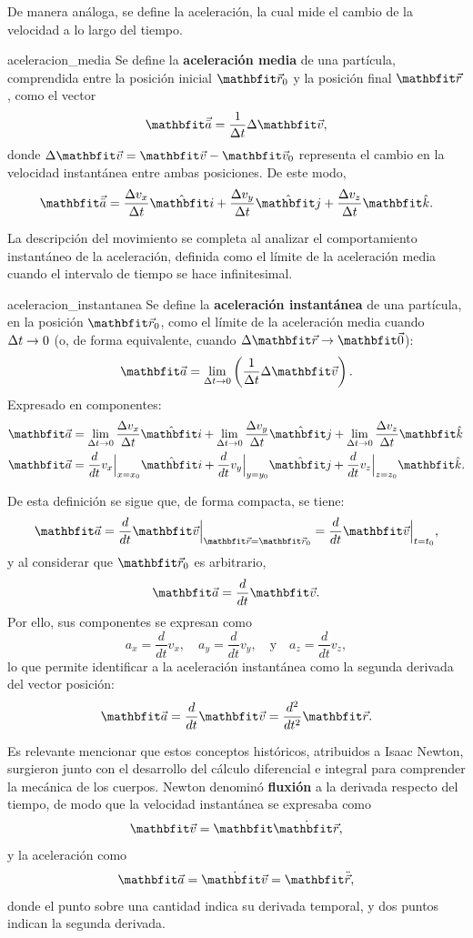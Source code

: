 De manera análoga, se define la aceleración, la cual mide el cambio de la velocidad a lo largo del tiempo.

\begin{definition}{}{aceleracion_media}
    Se define la \textbf{aceleración media} de una partícula, comprendida entre la posición inicial $\vecr_0$ y la posición final $\vecr$, como el vector
    $$\acem = \frac{1}{\Deltat}\Deltav,$$
    donde $\Deltav = \veloi - \veloi_0$ representa el cambio en la velocidad instantánea entre ambas posiciones. De este modo,
    $$\acem = \frac{\Deltavx}{\Deltat}\veci + \frac{\Deltavy}{\Deltat}\vecj + \frac{\Deltavz}{\Deltat}\veck.$$
\end{definition}

La descripción del movimiento se completa al analizar el comportamiento instantáneo de la aceleración, definida como el límite de la aceleración media cuando el intervalo de tiempo se hace infinitesimal.

\begin{definition}{}{aceleracion_instantanea}
    Se define la \textbf{aceleración instantánea} de una partícula, en la posición $\vecr_0$, como el límite de la aceleración media cuando $\Delta t \to 0$ (o, de forma equivalente, cuando $\Deltar \to \vecce$):
    $$\acei = \lim_{\Deltat \to 0}\left(\frac{1}{\Deltat}\Deltav\right).$$
    Expresado en componentes:
    \begin{align*}
        \acei & = \lim_{\Deltat \to 0}\frac{\Deltavx}{\Deltat}\veci + \lim_{\Deltat \to 0}\frac{\Deltavy}{\Deltat}\vecj + \lim_{\Deltat \to 0}\frac{\Deltavz}{\Deltat}\veck \\
        \acei & = \frac{d}{dt}v_x\Big|_{x = x_0}\veci + \frac{d}{dt}v_y\Big|_{y = y_0}\vecj + \frac{d}{dt}v_z\Big|_{z = z_0}\veck.
    \end{align*}
\end{definition}

De esta definición se sigue que, de forma compacta, se tiene:
$$\acei = \frac{d}{dt}\veloi\Big|_{\vecr = \vecr_0} = \frac{d}{dt}\veloi\Big|_{t = t_0},$$
y al considerar que $\vecr_0$ es arbitrario,
$$\acei = \frac{d}{dt}\veloi.$$
Por ello, sus componentes se expresan como
$$a_x = \frac{d}{dt}v_x,\quad a_y = \frac{d}{dt}v_y,\quad \text{y} \quad a_z = \frac{d}{dt}v_z,$$
lo que permite identificar a la aceleración instantánea como la segunda derivada del vector posición:
$$\acei = \frac{d}{dt}\veloi = \frac{d^2}{dt^2}\vecr.$$

Es relevante mencionar que estos conceptos históricos, atribuidos a Isaac Newton, surgieron junto con el desarrollo del cálculo diferencial e integral para comprender la mecánica de los cuerpos. Newton denominó \textbf{fluxión} a la derivada respecto del tiempo, de modo que la velocidad instantánea se expresaba como
$$\veloi = \veloinew,$$
y la aceleración como
$$\acei = \dot{\veloi} = \aceinew,$$
donde el punto sobre una cantidad indica su derivada temporal, y dos puntos indican la segunda derivada.

